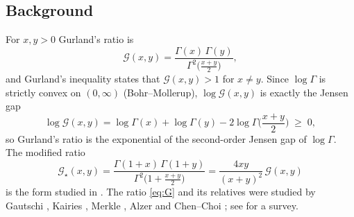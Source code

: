 \documentclass[11pt,a4paper]{amsart}
\theoremstyle{definition}
\newcommand{\Gg}{\mathcal{G}}
\newcommand{\Gs}{\mathcal{G}_{\star}}
\begin{document}
\subsection{Background}
For $x,y>0$ Gurland's ratio \cite{Gurland56} is
\begin{equation}\label{eq:G}
  \Gg(x,y)=\frac{\Gamma(x)\,\Gamma(y)}{\Gamma^{2}\big(\frac{x+y}{2}\big)},
\end{equation}
and Gurland's inequality states that $\Gg(x,y)>1$ for $x\ne y$. Since $\log\Gamma$ is
strictly convex on $(0,\infty)$ (Bohr--Mollerup), $\log\Gg(x,y)$ is exactly the
Jensen gap
\begin{equation}\label{eq:jensen}
  \log\Gg(x,y)=\log\Gamma(x)+\log\Gamma(y)-2\log\Gamma\Big(\frac{x+y}{2}\Big)\;\ge\;0,
\end{equation}
so Gurland's ratio is the exponential of the second-order Jensen gap of $\log\Gamma$.
The modified ratio
\begin{equation}\label{eq:Gs}
  \Gs(x,y)=\frac{\Gamma(1+x)\,\Gamma(1+y)}{\Gamma^{2}\big(1+\frac{x+y}{2}\big)}
            =\frac{4xy}{(x+y)^{2}}\,\Gg(x,y)
\end{equation}
is the form studied in \cite{Wisniewska25}. The ratio \eqref{eq:G} and its relatives were
studied by Gautschi \cite{Gautschi74}, Kairies \cite{Kairies83}, Merkle \cite{Merkle05},
Alzer \cite{Alzer01} and Chen--Choi \cite{ChenChoi17}; see \cite{LaforgiaNatalini13} for
a survey.
\end{document}
